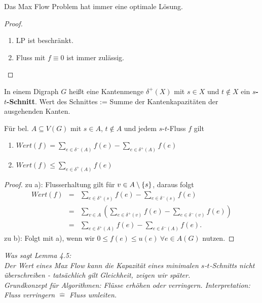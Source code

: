 \begin{beobachtung}
	Das Max Flow Problem hat immer eine optimale Lösung.
\end{beobachtung}
\begin{proof}~
	\begin{enumerate}
		\item LP ist beschränkt.
		\item Fluss mit $f\equiv 0$ ist immer zulässig.
	\end{enumerate}
\end{proof}
\begin{definition}
	In einem Digraph $G$ heißt eine Kantenmenge $\delta^+(X)$ mit $s\in X$ und $t\notin X$ ein \textbf{$s$-$t$-Schnitt}.
	Wert des Schnittes := Summe der Kantenkapazitäten der ausgehenden Kanten.
\end{definition}
\begin{lemma}
	Für bel. $A\subseteq V(G)$ mit $s\in A$, $t\notin A$ und jedem $s$-$t$-Fluss $f$ gilt
	\begin{enumerate}[label=\alph*)]
		\item $Wert(f) = \sum_{e\in \delta^-(A)} f(e) - \sum_{e\in \delta^+(A)} f(e)$
		\item $Wert(f) \le \sum_{e\in \delta^+(A)} f(e)$
	\end{enumerate}
\end{lemma}
\begin{proof}
	zu a): Flusserhaltung gilt für $v\in A\setminus \{s\}$, daraus folgt
	\begin{eqnarray*}
		Wert(f) &=& \sum_{e\in \delta^+(s)} f(e) - \sum_{e\in \delta^-(s)} f(e)\\
		&=& \sum_{v\in A}(\sum_{e\in \delta^+(v)} f(e) - \sum_{e\in \delta^-(v)} f(e))\\
		&=& \sum_{e\in \delta^+(A)} f(e) - \sum_{e\in \delta^-(A)} f(e).
	\end{eqnarray*}
	zu b): Folgt mit a), wenn wir $0 \le f(e) \le u(e)~\forall e\in A(G)$ nutzen.
\end{proof}
\textit{Was sagt Lemma 4.5:\\[5pt]
Der Wert eines Max Flow kann die Kapazität eines minimalen $s$-$t$-Schnitts nicht überschreiben - tatsächlich gilt Gleichheit, zeigen wir später.\\[5pt]
Grundkonzept für Algorithmen: Flüsse erhöhen oder verringern. Interpretation: Fluss verringern $\widehat{=}$ Fluss umleiten.}
